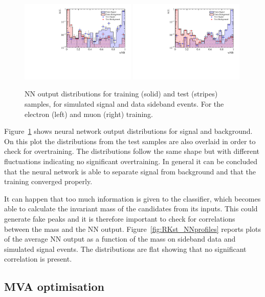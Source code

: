 \begin{figure}
\centering
\includegraphics[width=0.49\textwidth]{RKst/figs/Training/EE_wNB_TrainAndTest.pdf}
\includegraphics[width=0.49\textwidth]{RKst/figs/Training/MM_wNB_TrainAndTest.pdf}
\caption{NN output distributions for training (solid) and test (stripes) samples, for simulated 
signal and data sideband events. For the electron (left) and muon (right) training.}
\label{fig:RKst_nnDist}
\end{figure}

Figure~\ref{fig:RKst_nnDist} shows neural network output distributions for signal and background.
On this plot the distributions from the test samples are also overlaid in order to check for overtraining. 
The distributions follow the same shape but with different fluctuations indicating no
significant overtraining. In general it can be concluded that the neural network is able to separate signal
from background and that the training converged properly.

It can happen that too much information is given to the classifier, which becomes able to 
calculate the invariant mass of the candidates from its inputs. This could generate fake peaks and it is therefore
important to check for correlations between the \Bz mass and the NN output. Figure~\ref{fig:RKst_NNprofiles} reports
plots of the average NN output as a function of the \Bz mass on sideband data and simulated signal events.
The distributions are flat showing that no significant correlation is present.


\subsection{MVA optimisation}

